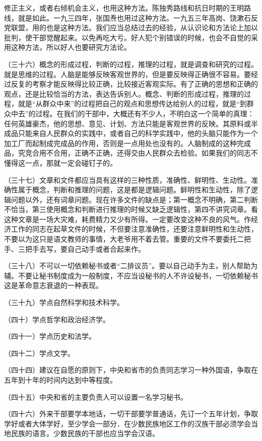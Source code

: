 修正主义，或者右倾机会主义，也用这种方法。陈独秀路线和抗日时期的王明路线，就是如此。一九三四年，张国焘也用过这种方法。一九五三年高岗、饶漱石反党联盟，用的也是这种方法。我们应当总结过去的经验，从认识论和方法论上加以批判，使干部觉醒起来。以免再吃大亏。好人犯个别错误的时候，也会不自觉的采用这种方法，所以好人也要研究方法论。

（三十六）概念的形成过程，判断的过程，推理的过程，就是调查和研究的过程。就是思维的过程。人脑是能够反映客观世界的，但是要反映得正确很不容易。要经过反复的考察才能反映得比较正确，比较接近客观实际。有了正确的思想和正确的观点，还是比较恰当的方法，表达告诉别人。概念、判断的形成过程，推理的过程，就是“从群众中来”的过程把自己的观点和思想传达给别人的过程，就是“到群众中去”的过程。在我们的干部中，大概还有不少人，不明白这一个简单的真理：任何英雄豪杰，他的思想、意见、计划、方法只能是客观世界的反映。其原料或半成品只能来自人民群众的实践中，或者自己的科学实践中，他的头脑只能作为一个加工厂而起制成完成品的作用，否则是一点用处也没有的。人脑制成的这种完成品，究竞合用不合用，正确不正确，还得交由人民群众去检验。如果我们的同志不懂得这一点，那就一定会碰钉子的。

（三十七）文章和文件都应当具有这样的三种性质，准确性、鲜明性、生动性。准确性属于概念，判断和推理的问题，这是都是逻辑问题。鲜明性和生动性，除了逻辑问题以外，还有词章问题。现在许多文件的缺点是；第一概念不明确，第二判断不恰当，第三使用概念和判断进行推理的时候又缺乏逻辑性，第四不讲究词章。看这种文章是一场大灾难，耗费精力又少有所得。一定要改变这种不良的风气。作经济工作的同志在起草文件的时候，不但要注意准确性，还要注意鲜明性和生动性，不要以为这只是语文教师的事情，大老爷用不着去管。重要的文件不要委托二把手、三把手去写，要自己动手或者合起来作。

（三十八）不可以一切依赖秘书或者“二排议员”。要以自己动手为主，别人帮助为辅。不要让秘书制度成为一般制度，不应当设秘书的人不许设秘书，一切依赖秘书这是革命意志衰退的一种表现。

（三十九）学点自然科学和技术科学。

（四十）学点哲学和政治经济学。

（四十一）学点历史和法学。

（四十二）学点文学。

（四十四）建议在自愿的原则下，中央和省市的负责同志学习一种外国语，争取在五年到十年的时间内达到中等程度。

（四十五）中央和省的主要负责人可以设置一名学习秘书。

（四十六）外来干部要学本地话，一切干部要学普通话，先订一个五年计划，争取学好或者大体学好，至少学会一部分．在少数民族地区工作的汉族干部必须学会当地民族的语言。少数民族的干部也应当学会汉语。

